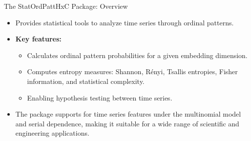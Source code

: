 \documentclass{beamer}
\begin{document}




\begin{frame}{The StatOrdPattHxC Package: Overview}
	\begin{itemize}
		\item Provides statistical tools to analyze time series through ordinal patterns.
		\item \textbf{Key features:}
		\begin{itemize}
			\item Calculates ordinal pattern probabilities for a given embedding dimension.
			\item Computes entropy measures: Shannon, Rényi, Tsallis entropies, Fisher information, and statistical complexity.
			\item Enabling hypothesis testing between time series.
		\end{itemize}
		\item The package supports for time series features under the multinomial model and serial dependence, making it suitable for a wide range of scientific and engineering applications.
	\end{itemize}
\end{frame}
\end{document}
